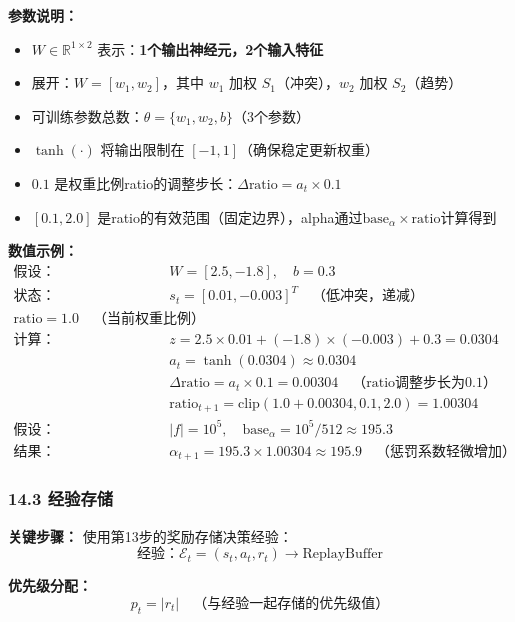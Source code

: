 \documentclass[11pt,a3paper]{ctexart}
\begin{document}
\textbf{参数说明：}
\begin{itemize}
    \item $W \in \mathbb{R}^{1 \times 2}$ 表示：\textbf{1个输出神经元，2个输入特征}
    \item 展开：$W = [w_1, w_2]$，其中 $w_1$ 加权 $S_1$（冲突），$w_2$ 加权 $S_2$（趋势）
    \item 可训练参数总数：$\theta = \{w_1, w_2, b\}$（3个参数）
    \item $\tanh(\cdot)$ 将输出限制在 $[-1, 1]$（确保稳定更新权重）
   \item $0.1$ 是权重比例ratio的调整步长：$\Delta\text{ratio} = a_t \times 0.1$
    \item $[0.1, 2.0]$ 是ratio的有效范围（固定边界），alpha通过$\text{base}_\alpha \times \text{ratio}$计算得到
\end{itemize}

\textbf{数值示例：}
\begin{align*}
\text{假设：} & W = [2.5, -1.8], \quad b = 0.3 \\
\text{状态：} & s_t = [0.01, -0.003]^T \quad \text{（低冲突，递减）} \\
\text{ratio} = 1.0 \quad \text{（当前权重比例）} \\
\text{计算：} & z = 2.5 \times 0.01 + (-1.8) \times (-0.003) + 0.3 = 0.0304 \\
& a_t = \tanh(0.0304) \approx 0.0304 \\
& \Delta\text{ratio} = a_t \times 0.1 = 0.00304 \quad \text{（ratio调整步长为0.1）} \\
& \text{ratio}_{t+1} = \text{clip}(1.0 + 0.00304, 0.1, 2.0) = 1.00304 \\
\text{假设：} & |f| = 10^5, \quad \text{base}_\alpha = 10^5 / 512 \approx 195.3 \\
\text{结果：} & \alpha_{t+1} = 195.3 \times 1.00304 \approx 195.9 \quad \text{（惩罚系数轻微增加）}
\end{align*}

\subsubsection*{14.3 经验存储}
\textbf{关键步骤：} 使用第13步的奖励存储决策经验：
\begin{equation}
\text{经验：} \mathcal{E}_t = (s_t, a_t, r_t) \rightarrow \text{ReplayBuffer}
\end{equation}

\textbf{优先级分配：}
\begin{equation}
p_t = |r_t| \quad \text{（与经验一起存储的优先级值）}
\end{equation}
\end{document}

